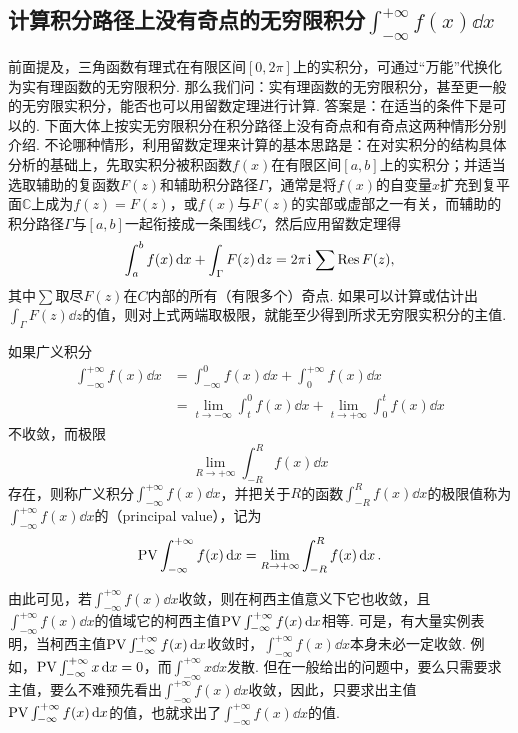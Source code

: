 \subsection{计算积分路径上没有奇点的无穷限积分\texorpdfstring{\(\int_{-\infty}^{+\infty} f(x) \dd{x}\)}{}}
前面提及，三角函数有理式在有限区间\([0,2\pi]\)上的实积分，可通过“万能”代换化为实有理函数的无穷限积分.
那么我们问：实有理函数的无穷限积分，甚至更一般的无穷限实积分，能否也可以用留数定理进行计算.
答案是：在适当的条件下是可以的.
下面大体上按实无穷限积分在积分路径上没有奇点和有奇点这两种情形分别介绍.
不论哪种情形，利用留数定理来计算的基本思路是：在对实积分的结构具体分析的基础上，先取实积分被积函数\(f(x)\)在有限区间\([a,b]\)上的实积分；并适当选取辅助的复函数\(F(z)\)和辅助积分路径\(\Gamma\)，通常是将\(f(x)\)的自变量\(x\)扩充到复平面\(\mathbb{C}\)上成为\(f(z)=F(z)\)，或\(f(x)\)与\(F(z)\)的实部或虚部之一有关，而辅助的积分路径\(\Gamma\)与\([a,b]\)一起衔接成一条围线\(C\)，然后应用留数定理得\begin{equation}
\int_a^b f(x) \dd{x}
+ \int_{\Gamma} F(z) \dd{z}
= 2\pi\kern1pt\mathrm{i}\kern1pt \sum \operatorname{Res} F(z),
\end{equation}
其中\(\sum\)取尽\(F(z)\)在\(C\)内部的所有（有限多个）奇点.
如果可以计算或估计出\(\int_{\Gamma} F(z) \dd{z}\)的值，则对上式两端取极限，就能至少得到所求无穷限实积分的主值.

如果广义积分\begin{align*}
\int_{-\infty}^{+\infty} f(x) \dd{x}
&= \int_{-\infty}^0 f(x) \dd{x} + \int_0^{+\infty} f(x) \dd{x} \\
&= \lim\limits_{t \to -\infty} \int_t^0 f(x) \dd{x}
	+ \lim\limits_{t \to +\infty} \int_0^t f(x) \dd{x}
\end{align*}
不收敛，而极限\[
\lim\limits_{R\to+\infty} \int_{-R}^R f(x) \dd{x}
\]存在，则称广义积分\(\int_{-\infty}^{+\infty} f(x) \dd{x}\)，并把关于\(R\)的函数\(\int_{-R}^R f(x) \dd{x}\)的极限值称为\(\int_{-\infty}^{+\infty} f(x) \dd{x}\)的（principal value），记为\[
{\rm PV} \int_{-\infty}^{+\infty} f(x) \dd{x}
= \lim\limits_{R\to+\infty} \int_{-R}^R f(x) \dd{x}.
\]

由此可见，若\(\int_{-\infty}^{+\infty} f(x) \dd{x}\)收敛，则在柯西主值意义下它也收敛，且\(\int_{-\infty}^{+\infty} f(x) \dd{x}\)的值域它的柯西主值\({\rm PV} \int_{-\infty}^{+\infty} f(x) \dd{x}\)相等.
可是，有大量实例表明，当柯西主值\({\rm PV} \int_{-\infty}^{+\infty} f(x) \dd{x}\)收敛时，\(\int_{-\infty}^{+\infty} f(x) \dd{x}\)本身未必一定收敛.
例如，\({\rm PV} \int_{-\infty}^{+\infty} x \dd{x} = 0\)，而\(\int_{-\infty}^{+\infty} x \dd{x}\)发散.
但在一般给出的问题中，要么只需要求主值，要么不难预先看出\(\int_{-\infty}^{+\infty} f(x) \dd{x}\)收敛，因此，只要求出主值\({\rm PV} \int_{-\infty}^{+\infty} f(x) \dd{x}\)的值，也就求出了\(\int_{-\infty}^{+\infty} f(x) \dd{x}\)的值.

